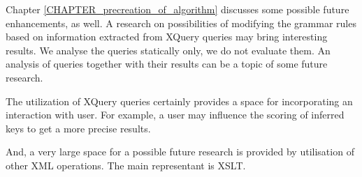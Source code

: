 Chapter \ref{CHAPTER_precreation_of_algorithm} discusses some possible future enhancements, as well. A research on possibilities of modifying the grammar rules based on information extracted from XQuery queries may bring interesting results. We analyse the queries statically only, we do not evaluate them. An analysis of queries together with their results can be a topic of some future research.

The utilization of XQuery queries certainly provides a space for incorporating an interaction with user. For example, a user may influence the scoring of inferred keys to get a more precise results.

And, a very large space for a possible future research is provided by utilisation of other XML operations. The main representant is XSLT.